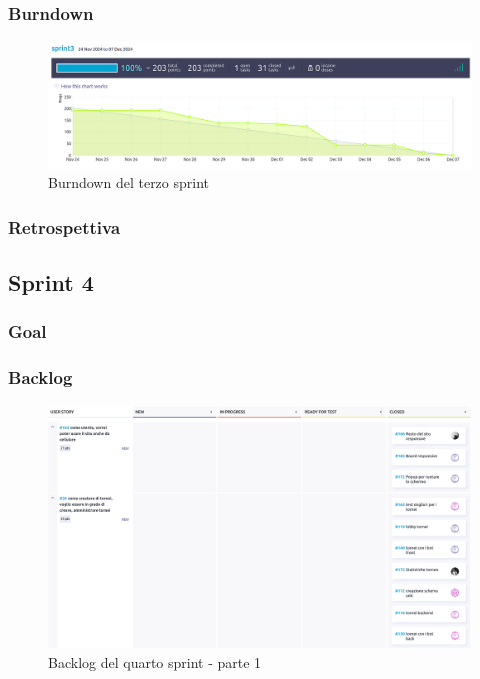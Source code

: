 \documentclass{article}
\begin{document}
\subsubsection{Burndown}
\begin{figure}[H]
    \centering
    \includegraphics[width=1\textwidth]{burndown3}
    \caption{Burndown del terzo sprint}
    \label{fig:burndown3}
\end{figure}

\subsubsection{Retrospettiva}

\subsection{Sprint 4}

\subsubsection{Goal}

\subsubsection{Backlog}
\begin{figure}[H]
    \centering
    \includegraphics[width=1\textwidth]{backlog4_1}
    \caption{Backlog del quarto sprint - parte 1}
    \label{fig:backlog4_1}
\end{figure}
\end{document}
